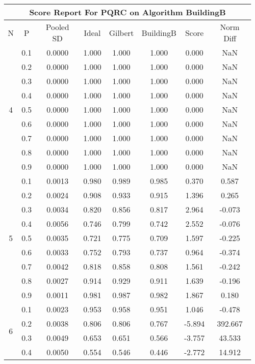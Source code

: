 \documentclass[11pt,a4paper]{report}
\begin{document}
\begin{longtable}{ | c | c || c | c | c | c | c | c | }
\hline
\multicolumn{8}{|c|}{ Score Report For PQRC on Algorithm BuildingB} \\
\hline
N & P & Pooled SD &  Ideal &  Gilbert & BuildingB  & Score & Norm Diff \\
 \hline
 \hline
 \endhead
\multirow{9}{*}{4} & 0.1 & 0.0000 & 1.000 & 1.000 & 1.000 & 0.000 & NaN \\
 & 0.2 & 0.0000 & 1.000 & 1.000 & 1.000 & 0.000 & NaN \\
 & 0.3 & 0.0000 & 1.000 & 1.000 & 1.000 & 0.000 & NaN \\
 & 0.4 & 0.0000 & 1.000 & 1.000 & 1.000 & 0.000 & NaN \\
 & 0.5 & 0.0000 & 1.000 & 1.000 & 1.000 & 0.000 & NaN \\
 & 0.6 & 0.0000 & 1.000 & 1.000 & 1.000 & 0.000 & NaN \\
 & 0.7 & 0.0000 & 1.000 & 1.000 & 1.000 & 0.000 & NaN \\
 & 0.8 & 0.0000 & 1.000 & 1.000 & 1.000 & 0.000 & NaN \\
 & 0.9 & 0.0000 & 1.000 & 1.000 & 1.000 & 0.000 & NaN \\
 \hline
\multirow{9}{*}{5} & 0.1 & 0.0013 & 0.980 & 0.989 & 0.985 & 0.370 & 0.587 \\
 & 0.2 & 0.0024 & 0.908 & 0.933 & 0.915 & 1.396 & 0.265 \\
 & 0.3 & 0.0034 & 0.820 & 0.856 & 0.817 & 2.964 & -0.073 \\
 & 0.4 & 0.0056 & 0.746 & 0.799 & 0.742 & 2.552 & -0.076 \\
 & 0.5 & 0.0035 & 0.721 & 0.775 & 0.709 & 1.597 & -0.225 \\
 & 0.6 & 0.0033 & 0.752 & 0.793 & 0.737 & 0.964 & -0.374 \\
 & 0.7 & 0.0042 & 0.818 & 0.858 & 0.808 & 1.561 & -0.242 \\
 & 0.8 & 0.0027 & 0.914 & 0.929 & 0.911 & 1.639 & -0.196 \\
 & 0.9 & 0.0011 & 0.981 & 0.987 & 0.982 & 1.867 & 0.180 \\
 \hline
\multirow{9}{*}{6} & 0.1 & 0.0023 & 0.953 & 0.958 & 0.951 & 1.046 & -0.478 \\
 & 0.2 & 0.0038 & 0.806 & 0.806 & 0.767 & -5.894 & 392.667 \\
 & 0.3 & 0.0049 & 0.653 & 0.651 & 0.566 & -3.757 & 43.533 \\
 & 0.4 & 0.0050 & 0.554 & 0.546 & 0.446 & -2.772 & 14.912 \\

\end{longtable}
\end{document}

